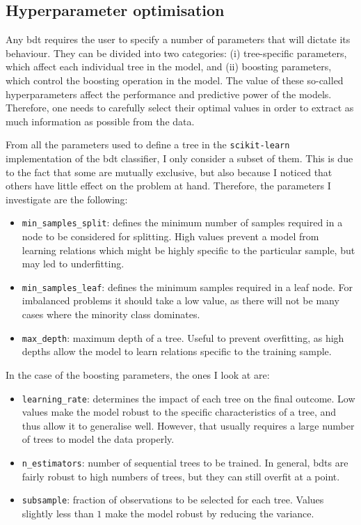 \subsection{Hyperparameter optimisation}

Any \gls{bdt} requires the user to specify a number of parameters that will dictate its behaviour. They can be divided into two categories: (i) tree-specific parameters, which affect each individual tree in the model, and (ii) boosting parameters, which control the boosting operation in the model. The value of these so-called hyperparameters affect the performance and predictive power of the models. Therefore, one needs to carefully select their optimal values in order to extract as much information as possible from the data.

From all the parameters used to define a tree in the \texttt{scikit-learn} implementation of the \gls{bdt} classifier, I only consider a subset of them. This is due to the fact that some are mutually exclusive, but also because I noticed that others have little effect on the problem at hand. Therefore, the parameters I investigate are the following:
\begin{itemize}
	\item \texttt{min_samples_split}: defines the minimum number of samples required in a node to be considered for splitting. High values prevent a model from learning relations which might be highly specific to the particular sample, but may led to underfitting.
	\item \texttt{min_samples_leaf}: defines the minimum samples required in a leaf node. For imbalanced problems it should take a low value, as there will not be many cases where the minority class dominates.
	\item \texttt{max_depth}: maximum depth of a tree. Useful to prevent overfitting, as high depths allow the model to learn relations specific to the training sample.
\end{itemize}
In the case of the boosting parameters, the ones I look at are:
\begin{itemize}
	\item \texttt{learning_rate}: determines the impact of each tree on the final outcome. Low values make the model robust to the specific characteristics of a tree, and thus allow it to generalise well. However, that usually requires a large number of trees to model the data properly.
	\item \texttt{n_estimators}: number of sequential trees to be trained. In general, \gls{bdt}s are fairly robust to high numbers of trees, but they can still overfit at a point.
	\item \texttt{subsample}: fraction of observations to be selected for each tree. Values slightly less than $1$ make the model robust by reducing the variance.
\end{itemize}

